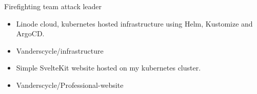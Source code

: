 \documentclass[10pt,a4paper,ragged2e,withhyper]{altacv}
\begin{document}
\begin{paracol}{2}
\cvachievements{\faCertificate}
Firefighting team attack leader


\begin{itemize}
\item Linode cloud, kubernetes hosted infrastructure using Helm, Kustomize and
  ArgoCD.
\item \faGithub Vanderscycle/infrastructure
\end{itemize}

\begin{itemize}
\item Simple SvelteKit website hosted on my kubernetes cluster.
\item \faGithub Vanderscycle/Professional-website
\end{itemize}
\end{paracol}
\end{document}
